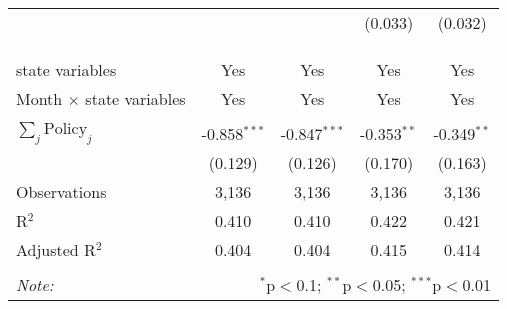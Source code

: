 \begin{tabular}{@{\extracolsep{1pt}}lcccc}
  &  &  & (0.033) & (0.032) \\ 
   &  &  &  &  \\ 
  &  &  &  &  \\ 
 \hline \\[-1.8ex] 
state variables & Yes & Yes & Yes & Yes \\ 
Month $\times$ state variables & Yes & Yes & Yes & Yes \\ 
\hline \\[-1.8ex] 
$\sum_j \mathrm{Policy}_j$ & -0.858$^{***}$ & -0.847$^{***}$ & -0.353$^{**}$ & -0.349$^{**}$ \\ 
 & (0.129) & (0.126) & (0.170) & (0.163) \\ 
Observations & 3,136 & 3,136 & 3,136 & 3,136 \\ 
R$^{2}$ & 0.410 & 0.410 & 0.422 & 0.421 \\ 
Adjusted R$^{2}$ & 0.404 & 0.404 & 0.415 & 0.414 \\ 
\hline 
\hline \\[-1.8ex] 
\textit{Note:}  & \multicolumn{4}{r}{$^{*}$p$<$0.1; $^{**}$p$<$0.05; $^{***}$p$<$0.01} \\ 
\end{tabular} 